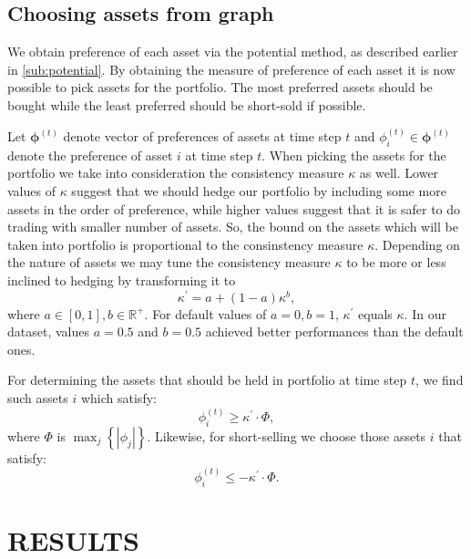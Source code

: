 \documentclass[letterpaper, 10 pt, conference]{ieeeconf}
\newcommand{\matr}[1]{\mathbold{#1}}
\begin{document}
  \subsection{Choosing assets from graph}
  We obtain preference of each asset via the potential method, as described earlier in \ref{sub:potential}.
  By obtaining the measure of preference of each asset it is now possible to pick assets for the portfolio.
  The most preferred assets should be bought while the least preferred should be short-sold if possible.
  
  Let $\matr{\phi}^{(t)}$ denote vector of preferences of assets at time step $t$ and $\phi_i^{(t)} \in \matr{\phi}^{(t)}$ denote the preference of asset $i$ at time step $t$.
  When picking the assets for the portfolio we take into consideration the consistency measure $\kappa$ as well.
  Lower values of $\kappa$ suggest that we should hedge our portfolio by including some more assets in the order of preference, while higher values suggest that it is safer to do trading with smaller number of assets.
  So, the bound on the assets which will be taken into portfolio is proportional to the consinstency measure $\kappa$.
  Depending on the nature of assets we may tune the consistency measure $\kappa$ to be more or less inclined to hedging by transforming it to
  \begin{equation}
    \kappa^\prime = a + (1 - a)\kappa^b,
  \end{equation}
  where $a \in [0, 1], b \in \mathbb{R}^+$.
  For default values of $a = 0, b = 1$, $\kappa^\prime$ equals $\kappa$.
  In our dataset, values $a = 0.5$ and $b = 0.5$ achieved better performances than the default ones.
  
  For determining the assets that should be held in portfolio at time step $t$, we find such assets $i$ which satisfy:
  \begin{equation}
    \phi_i^{(t)} \ge \kappa^\prime \cdot \Phi,
  \end{equation}
  where $\Phi$ is $\max_j \left\{ \left| \phi_j \right| \right\}$.
  Likewise, for short-selling we choose those assets $i$ that satisfy:
  \begin{equation}
    \phi_i^{(t)} \le -\kappa^\prime \cdot \Phi.
  \end{equation}
  
  \section{RESULTS}
  
\end{document}
